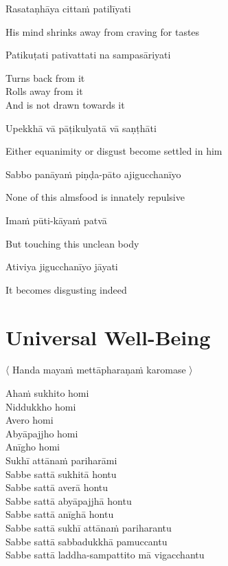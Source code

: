 Rasataṇhāya cittaṁ patilīyati

\begin{english}
  His mind shrinks away from craving for tastes
\end{english}

Patikuṭati pativattati na sampasāriyati

\begin{english}
  Turns back from it\\
  Rolls away from it\\
  And is not drawn towards it
\end{english}

Upekkhā vā pāṭikulyatā vā saṇṭhāti

\begin{english}
  Either equanimity or disgust become settled in him
\end{english}

\suttaRef{[AN 7.49]}

Sabbo panāyaṁ piṇḍa-pāto ajigucchanīyo

\begin{english}
  None of this almsfood is innately repulsive
\end{english}

Imaṁ pūti-kāyaṁ patvā

\begin{english}
  But touching this unclean body
\end{english}

Ativiya jigucchanīyo jāyati

\begin{english}
  It becomes disgusting indeed
\end{english}

\suttaRef{[Trad]}


\section{Universal Well-Being}
\label{universal-well-being}

\begin{leader}
  〈 Handa mayaṁ mettāpharaṇaṁ karomase 〉
\end{leader}

Ahaṁ sukhito homi\\
Niddukkho homi\\
Avero homi\\
Abyāpajjho homi\\
Anīgho homi\\
Sukhī attānaṁ pariharāmi\\
Sabbe sattā sukhitā hontu\\
Sabbe sattā averā hontu\\
Sabbe sattā abyāpajjhā hontu\\
Sabbe sattā anīghā hontu\\
Sabbe sattā sukhī attānaṁ pariharantu\\
Sabbe sattā sabbadukkhā pamuccantu\\
Sabbe sattā laddha-sampattito mā vigacchantu

